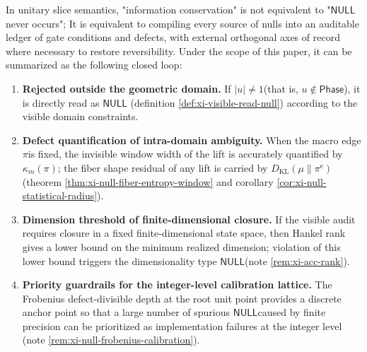 \begin{remark}\label{rem:xi-null-conservation-closure}
In unitary slice semantics, "information conservation" is not equivalent to "\(\mathsf{NULL}\) ​​never occurs";
It is equivalent to compiling every source of nulls into an auditable ledger of gate conditions and defects, with external orthogonal axes of record where necessary to restore reversibility.
Under the scope of this paper, it can be summarized as the following closed loop:
\begin{enumerate}
  \item \textbf{Rejected outside the geometric domain.} If \(|u|\neq 1\) ​​(that is, \(u\notin\mathsf{Phase}\)), it is directly read as \(\mathsf{NULL}\) (definition \ref{def:xi-visible-read-null}) according to the visible domain constraints.
  \item \textbf{Defect quantification of intra-domain ambiguity.} When the macro edge \(\pi\) ​​is fixed, the invisible window width of the lift is accurately quantified by \(\kappa_m(\pi)\); the fiber shape residual of any lift is carried by \(D_{\mathrm{KL}}(\mu\|\pi^{\mathrm{e}})\) (theorem \ref{thm:xi-null-fiber-entropy-window} and corollary \ref{cor:xi-null-statistical-radius}).
  \item \textbf{Dimension threshold of finite-dimensional closure.} If the visible audit requires closure in a fixed finite-dimensional state space, then Hankel rank gives a lower bound on the minimum realized dimension; violation of this lower bound triggers the dimensionality type \(\mathsf{NULL}\) ​​(note \ref{rem:xi-acc-rank}).
  \item \textbf{Priority guardrails for the integer-level calibration lattice.} The Frobenius defect-divisible depth at the root unit point provides a discrete anchor point so that a large number of spurious \(\mathsf{NULL}\) ​​caused by finite precision can be prioritized as implementation failures at the integer level (note \ref{rem:xi-null-frobenius-calibration}).
\end{enumerate}
\end{remark}


